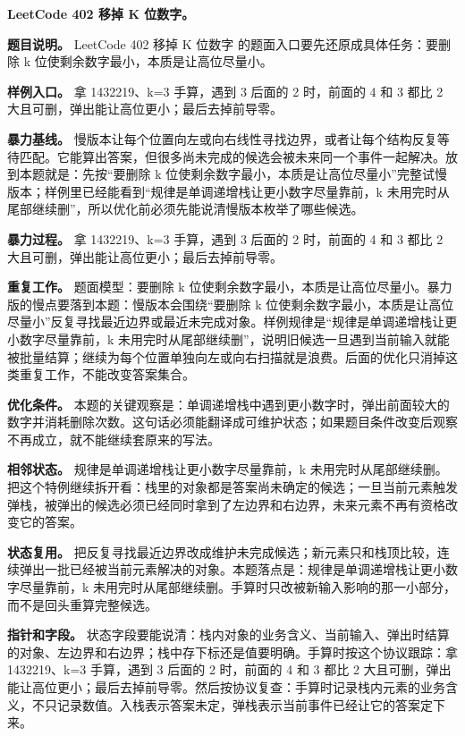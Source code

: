 \noindent\textbf{LeetCode 402 移掉 K 位数字。}

\textbf{题目说明。} LeetCode 402 移掉 K 位数字 的题面入口要先还原成具体任务：要删除 k 位使剩余数字最小，本质是让高位尽量小。

\textbf{样例入口。} 拿 1432219、k=3 手算，遇到 3 后面的 2 时，前面的 4 和 3 都比 2 大且可删，弹出能让高位更小；最后去掉前导零。

\textbf{暴力基线。} 慢版本让每个位置向左或向右线性寻找边界，或者让每个结构反复等待匹配。它能算出答案，但很多尚未完成的候选会被未来同一个事件一起解决。放到本题就是：先按“要删除 k 位使剩余数字最小，本质是让高位尽量小”完整试慢版本；样例里已经能看到“规律是单调递增栈让更小数字尽量靠前，k 未用完时从尾部继续删”，所以优化前必须先能说清慢版本枚举了哪些候选。

\textbf{暴力过程。} 拿 1432219、k=3 手算，遇到 3 后面的 2 时，前面的 4 和 3 都比 2 大且可删，弹出能让高位更小；最后去掉前导零。

\textbf{重复工作。} 题面模型：要删除 k 位使剩余数字最小，本质是让高位尽量小。暴力版的慢点要落到本题：慢版本会围绕“要删除 k 位使剩余数字最小，本质是让高位尽量小”反复寻找最近边界或最近未完成对象。样例规律是“规律是单调递增栈让更小数字尽量靠前，k 未用完时从尾部继续删”，说明旧候选一旦遇到当前输入就能被批量结算；继续为每个位置单独向左或向右扫描就是浪费。后面的优化只消掉这类重复工作，不能改变答案集合。

\textbf{优化条件。} 本题的关键观察是：单调递增栈中遇到更小数字时，弹出前面较大的数字并消耗删除次数。这句话必须能翻译成可维护状态；如果题目条件改变后观察不再成立，就不能继续套原来的写法。

\textbf{相邻状态。} 规律是单调递增栈让更小数字尽量靠前，k 未用完时从尾部继续删。把这个特例继续拆开看：栈里的对象都是答案尚未确定的候选；一旦当前元素触发弹栈，被弹出的候选必须已经同时拿到了左边界和右边界，未来元素不再有资格改变它的答案。

\textbf{状态复用。} 把反复寻找最近边界改成维护未完成候选；新元素只和栈顶比较，连续弹出一批已经被当前元素解决的对象。本题落点是：规律是单调递增栈让更小数字尽量靠前，k 未用完时从尾部继续删。手算时只改被新输入影响的那一小部分，而不是回头重算完整候选。

\textbf{指针和字段。} 状态字段要能说清：栈内对象的业务含义、当前输入、弹出时结算的对象、左边界和右边界；栈中存下标还是值要明确。手算时按这个协议跟踪：拿 1432219、k=3 手算，遇到 3 后面的 2 时，前面的 4 和 3 都比 2 大且可删，弹出能让高位更小；最后去掉前导零。然后按协议复查：手算时记录栈内元素的业务含义，不只记录数值。入栈表示答案未定，弹栈表示当前事件已经让它的答案定下来。

